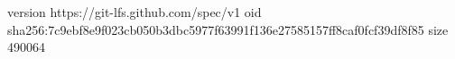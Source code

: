 version https://git-lfs.github.com/spec/v1
oid sha256:7c9ebf8e9f023cb050b3dbc5977f63991f136e27585157ff8caf0fcf39df8f85
size 490064
